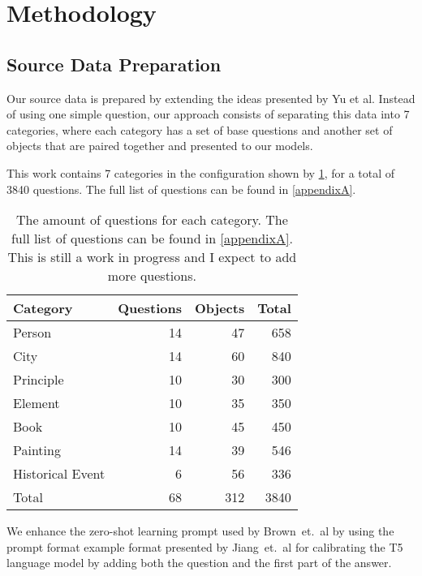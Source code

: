 \section{Methodology}

\newcommand{\cats}{7}
\newcommand{\baseqs}{68}
\newcommand{\things}{312}
\newcommand{\qs}{3840}

\subsection{Source Data Preparation}

Our source data is prepared by extending the ideas presented by Yu et al\cite{factual_recall}.
Instead of using one simple question, our approach consists of separating this data into \cats{} categories, where each category has a set of base questions and another set of objects that are paired together and presented to our models.

This work contains \cats{} categories in the configuration shown by \cref{categories_numbers}, for a total of \qs{} questions.
The full list of questions can be found in \cref{appendixA}.

\begin{table}[h]
	\centering
	\scriptsize
	\begin{tabular}{l | r r r}
		\toprule
			\bfseries Category & \bfseries Questions & \bfseries Objects & \bfseries Total \\
		\midrule
			Person           & 14 &  47 &  658 \\
			City             & 14 &  60 &  840 \\
			Principle        & 10 &  30 &  300 \\
			Element          & 10 &  35 &  350 \\
			Book             & 10 &  45 &  450 \\
			Painting         & 14 &  39 &  546 \\
			Historical Event & 6  &  56 &  336 \\
		\midrule
			Total & \baseqs{} & \things{} & \qs{} \\
		\bottomrule
	\end{tabular}
	\caption{The amount of questions for each category. The full list of questions can be found in \cref{appendixA}. This is still a work in progress and I expect to add more questions.}
	\label{categories_numbers}
\end{table}

We enhance the zero-shot learning prompt used by Brown~et.~al\cite{fewshotlearners} by using the prompt format example format presented by Jiang~et.~al\cite{how_can_we_know} for calibrating the T5 language model by adding both the question and the first part of the answer.

